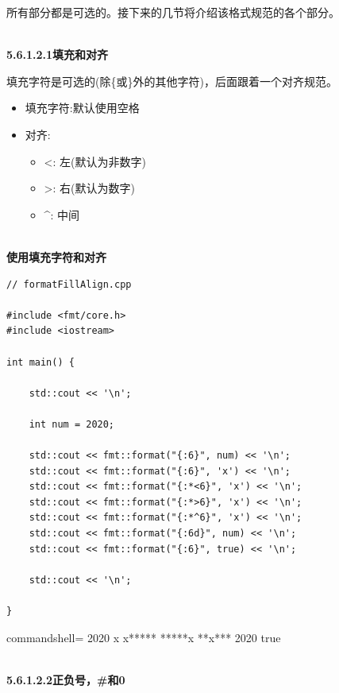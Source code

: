 所有部分都是可选的。接下来的几节将介绍该格式规范的各个部分。

\hspace*{\fill} \\ %
\noindent
\textbf{5.6.1.2.1\hspace{0.2cm}填充和对齐}

填充字符是可选的(除\{或\}外的其他字符)，后面跟着一个对齐规范。

\begin{itemize}
\item 
填充字符:默认使用空格

\item 
对齐:
\begin{itemize}
\item 
<: 左(默认为非数字)

\item 
>: 右(默认为数字)

\item 
\^{}: 中间
\end{itemize}
\end{itemize}

\hspace*{\fill} \\ %
\noindent
\textbf{使用填充字符和对齐}
\begin{lstlisting}[style=styleCXX]
// formatFillAlign.cpp

#include <fmt/core.h>
#include <iostream>

int main() {
	
	std::cout << '\n';
	
	int num = 2020;
	
	std::cout << fmt::format("{:6}", num) << '\n';
	std::cout << fmt::format("{:6}", 'x') << '\n';
	std::cout << fmt::format("{:*<6}", 'x') << '\n';
	std::cout << fmt::format("{:*>6}", 'x') << '\n';
	std::cout << fmt::format("{:*^6}", 'x') << '\n';
	std::cout << fmt::format("{:6d}", num) << '\n';
	std::cout << fmt::format("{:6}", true) << '\n';
	
	std::cout << '\n';
	
}
\end{lstlisting}

\begin{tcblisting}{commandshell={}}
  2020
x
x*****
*****x
**x***
  2020
true
\end{tcblisting}


\hspace*{\fill} \\ %
\noindent
\textbf{5.6.1.2.2\hspace{0.2cm}正负号，\#和0}

